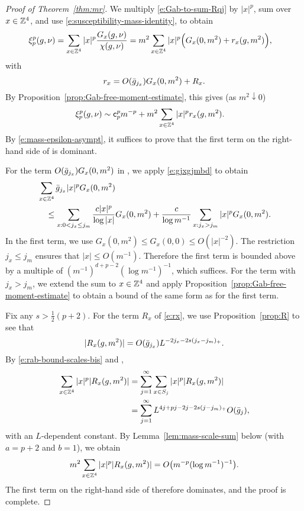 \begin{proof}[Proof of Theorem~\ref{thm:mr}]
We multiply \eqref{e:Gab-to-sum-Rqj} by $|x|^p$, sum over $x \in {\mathbb Z}^4$,
and use \eqref{e:susceptibility-mass-identity},
to obtain
\begin{align}
\xi_p^p(g,\nu)
&=
\sum_{x \in {\mathbb Z}^4} |x|^p \frac{G_{x}(g, \nu)}{\chi(g, \nu)}
= m^2 \sum_{x \in {\mathbb Z}^4} |x|^p \Big(G_{x}(0, m^2) + r_{x}(g,m^2) \Big),
\end{align}
with
\begin{equation}
\lbeq{rx}
    r_x = O(\gbar_{j_x})  G_x(0, m^2) + R_{x}.
\end{equation}
By
Proposition~\ref{prop:Gab-free-moment-estimate},
this gives (as $m^2 \downarrow 0$)
\begin{align}
\lbeq{ximasy}
\xi_p^p(g,\nu)
    & \sim
    {\sf c}_p^p m^{-p} +
    m^2 \sum_{x \in \Z^4} |x|^p  r_{x}(g,m^2).
\end{align}
By \eqref{e:mass-epsilon-asympt}, it suffices to prove that
the first term on the right-hand side of  is dominant.

For the term $O(\bar{g}_{j_x}) G_x(0, m^2)$ in ,
we apply \eqref{e:gjxgjmbd} to obtain
\begin{align}
\lbeq{easyerror}
    &\sum_{x \in \Z^4} \gbar_{j_x} |x|^p G_x(0, m^2)
    \nnb & \quad \le
    \sum_{x :  0<  j_x \le j_m} \frac{c |x|^p}{\log |x|} G_x(0, m^2)
    +
    \frac{c}{\log m^{-1}} \sum_{x : j_x >j_m}  |x|^p G_x(0, m^2).
\end{align}
In the first term,
we use $G_x(0, m^2) \le G_x(0, 0) \le O(|x|^{-2})$.  The restriction
$j_x \le j_m$ ensures that $|x| \le O(m^{-1})$.
Therefore the first term is bounded above by a multiple of
$(m^{-1})^{d+p-2}(\log m^{-1})^{-1}$, which suffices.
For the term with $j_x > j_m$, we extend the sum to $x \in {\mathbb Z}^4$
and apply Proposition~\ref{prop:Gab-free-moment-estimate}
to obtain a bound of the same form as for the first term.

Fix any $s>\frac 12 (p+2)$.
For the term $R_x$ of \eqref{e:rx}, we use Proposition~\ref{prop:R}
to see that
\begin{equation}\label{e:rab-bound-scales-bis}
|R_x(g, m^2)|
=
O(\bar{g}_{j_x})
L^{-2j_x - 2s (j_x - j_m)_+}.
\end{equation}
By \eqref{e:rab-bound-scales-bis} and ,
\begin{equation} \label{e:xpr-shells}
\begin{aligned}
    \sum_{x\in{\mathbb Z}^4} |x|^p |R_{x}(g,m^2)|
    &= \sum_{j = 1}^\infty\sum_{x\in S_j}   |x|^p |R_{x}(g,m^2)|
    \\
    &= \sum_{j = 1}^\infty
    L^{4j + pj - 2j - 2s (j - j_m)_+} O(\bar{g}_{j})
    ,
\end{aligned}
\end{equation}
with an $L$-dependent constant.
By Lemma~\ref{lem:mass-scale-sum} below (with $a=p+2$ and $b=1$),
we obtain
\begin{equation}\label{e:xpr-mbound}
    m^2 \sum_{x\in{\mathbb Z}^4} |x|^p |R_{x}(g,m^2)|
    = O\big( m^{-p}(\log m^{-1})^{-1}\big).
\end{equation}
The first term on the right-hand side of  therefore dominates,
and the proof is complete.
\end{proof}

